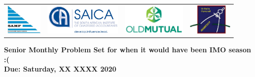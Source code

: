 \documentclass{article}
\begin{document}
\setlength{\tabcolsep}{5pt}
\begin{center} \begin{tabular}{cccc}
	\includegraphics[height=43pt]{SAMF_logo.jpg} &
	\includegraphics[height=43pt]{SAICA_logo.jpg} &
	\includegraphics[height=43pt]{OM_Logo_Stacked_Vignette_on_White_RGB.jpg} &
	\includegraphics[height=43pt]{SAMO2019.png}
\end{tabular} \end{center}

\bigskip

\begin{center}
\textbf{\Large Senior Monthly Problem Set for when it would have been IMO season :(}
\\ \vspace{1em}
\textbf{\large Due: Saturday, XX XXXX 2020}
\end{center}
\end{document}
